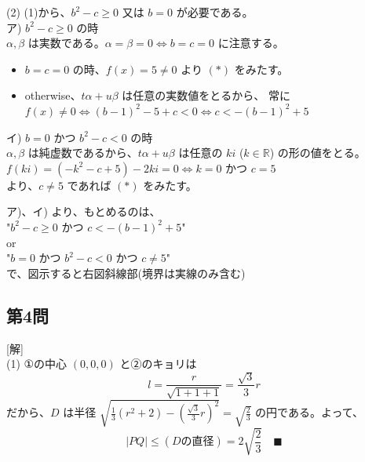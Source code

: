\documentclass[../main.tex]{subfiles}
\begin{document}
(2) (1)から、$b^2 - c \ge 0$ 又は $b = 0$ が必要である。\\
ア) $b^2 - c \ge 0$ の時\\
$\alpha, \beta$ は実数である。$\alpha = \beta = 0 \iff b = c = 0$ に注意する。
\begin{itemize}
\item $b = c = 0$ の時、$f(x) = 5 \neq 0$ より $(\ast)$ をみたす。
\item otherwise、$t\alpha + u\beta$ は任意の実数値をとるから、
  常に $f(x) \neq 0 \iff (b-1)^2 - 5 + c < 0 \iff c < -(b-1)^2 + 5$
\end{itemize}
イ) $b = 0$ かつ $b^2 - c < 0$ の時\\
$\alpha, \beta$ は純虚数であるから、$t\alpha + u\beta$ は任意の $ki$ ($k \in \mathbb{R}$) の形の値をとる。\\
$f(ki) = (-k^2 - c + 5) - 2ki = 0 \iff k = 0 \text{ かつ } c = 5$\\
より、$c \neq 5$ であれば $(\ast)$ をみたす。

ア)、イ) より、もとめるのは、\\
"$b^2 - c \ge 0$ かつ $c < -(b-1)^2 + 5$"\\
or\\
"$b = 0$ かつ $b^2 - c < 0$ かつ $c \neq 5$"\\
で、図示すると右図斜線部(境界は実線のみ含む)


\subsection*{第4問}
[解]\\
(1) ①の中心 $(0,0,0)$ と②のキョリは
\[ l = \frac{r}{\sqrt{1+1+1}} = \frac{\sqrt{3}}{3}r \]
だから、$D$ は半径 $\sqrt{\frac{1}{3}(r^2+2) - \left(\frac{\sqrt{3}}{3}r\right)^2} = \sqrt{\frac{2}{3}}$ の円である。よって、
\[ |PQ| \le (D\text{の直径}) = 2\sqrt{\frac{2}{3}} \quad \blacksquare \]
\end{document}
